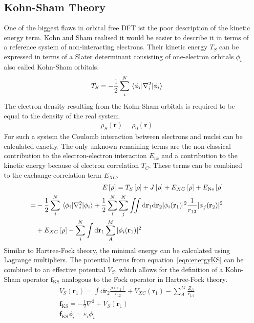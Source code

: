 \subsection{Kohn-Sham Theory}
\label{sec:kohnshamtheory}

One of the biggest flaws in orbital free \ac{DFT} ist the poor description of
the kinetic energy term. Kohn and Sham realised it would be easier to describe
it in terms of a reference system of non-interacting electrons. Their kinetic
energy $T_S$ can be expressed in terms of a Slater determinant consisting of
one-electron orbitals $\phi_i$ also called Kohn-Sham orbitals.
%
\begin{align}
    T_S=-\frac{1}{2}\sum_i^N\mel{\phi_i}{\nabla_i^2}{\phi_i}
\end{align}
%
The electron density resulting from the Kohn-Sham orbitals is required to be
equal to the density of the real system.
%
\begin{align}
    \rho_S(\mathbf{r}) = \rho_0(\mathbf{r})
\end{align}
%
For such a system the Coulomb interaction between electrons and nuclei can be
calculated exactly. The only unknown remaining terms are the non-classical
contribution to the electron-electron interaction $E_\text{nc}$ and a
contribution to the kinetic energy because of electron correlation $T_C$. These
terms can be combined to the exchange-correlation term $E_{XC}$.
%
\begin{align}
    E\left[\rho\right]=T_S\left[\rho\right] + J\left[\rho\right] + E_{XC}\left[\rho\right] + E_\text{Ne}\left[\rho\right] \\
    \begin{aligned}
        =&-\frac{1}{2}\sum_i^N\mel{\phi_i}{\nabla_i^2}{\phi_i} + \frac{1}{2}\sum_i^N\sum_j^N\iint \dd\mathbf{r}_1\dd\mathbf{r}_2|\phi_i(\mathbf{r}_1)|^2\frac{1}{r_{12}}|\phi_j(\mathbf{r}_2)|^2 \\
        &+ E_{XC}\left[\rho\right] - \sum_i^N\int\dd\mathbf{r}_1\sum_A^M|\phi_i(\mathbf{r}_1)|^2
    \end{aligned}\label{eqn:energyKS}
\end{align}
%
Similar to Hartree-Fock theory, the minimal energy can be calculated using
Lagrange multipliers. The potential terms from equation~\eqref{eqn:energyKS}
can be combined to an effective potential $V_S$, which allows for the
definition of a Kohn-Sham operator $\mathbf{f}_\text{KS}$ analogous to the Fock
operator in Hartree-Fock theory.
%
\begin{align}
    V_S(\mathbf{r}_1) = \int\dd\mathbf{r}_2\frac{\rho(\mathbf{r}_2)}{r_{12}} + V_{XC}(\mathbf{r}_1) - \sum_A^M\frac{Z_A}{r_{1A}}\\
    \mathbf{f}_\text{KS} = -\frac{1}{2}\nabla^2+V_S(\mathbf{r}_1)\\
    \mathbf{f}_\text{KS}\phi_i=\varepsilon_i\phi_i
\end{align}
